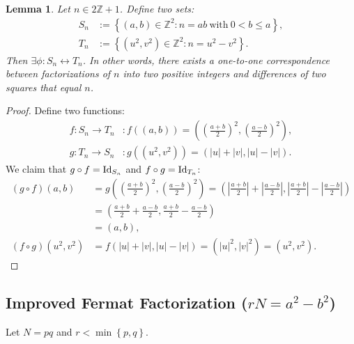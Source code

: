 \documentclass[12pt,openany]{book}
\newtheorem{lemma}[theorem]{Lemma}
\theoremstyle{definition}
\newcommand{\set}[1]{\left\{#1\right\}}
\newcommand{\Z}{\mathbb{Z}}
\newcommand{\of}[1]{\left( #1 \right)}
\newcommand{\abs}[1]{\left\lvert #1 \right\rvert}
\newcommand{\id}{\operatorname{\textnormal{Id}}}
\begin{document}
	\begin{tcolorbox}[colback=white,colframe=lemcolor,arc=5pt,title={\color{white}\bf }]
		\begin{lemma}
			Let $n\in 2\Z+1$. Define two sets: \begin{align*}
				S_n&:=\set{(a,b)\in\Z^2:n=ab\ \text{with}\ 0<b\leq a},\\
				T_n&:=\set{\of{u^2,v^2}\in\Z^2:n=u^2-v^2}.
			\end{align*} Then $\exists\phi:S_n\leftrightarrow T_n$. In other words, there exists a one-to-one correspondence between factorizations of $n$ into two positive integers and differences of two squares that equal $n$.
		\end{lemma}
	\end{tcolorbox}
	\begin{proof}
		Define two functions: \begin{align*}
			f:S_n\to T_n&:f\of{\of{a,b}}=\of{\of{\frac{a+b}{2}}^2,\of{\frac{a-b}{2}}^2},\\
			g:T_n\to S_n&:g\of{\of{u^2,v^2}}=\of{\abs{u}+\abs{v},\abs{u}-\abs{v}}.
		\end{align*} We claim that $g\circ f=\id_{S_n}$ and $f\circ g=\id_{T_n}$:\begin{align*}
			\of{g\circ f}(a,b)&=g\of{\of{\frac{a+b}{2}}^2,\of{\frac{a-b}{2}}^2}=\of{\abs{\frac{a+b}{2}}+\abs{\frac{a-b}{2}},\abs{\frac{a+b}{2}}-\abs{\frac{a-b}{2}}}\\
			&=\of{{\frac{a+b}{2}}+{\frac{a-b}{2}},{\frac{a+b}{2}}-{\frac{a-b}{2}}}\\
			&=\of{a,b},\\
			\of{f\circ g}\of{u^2,v^2}&=f\of{\abs{u}+\abs{v},\abs{u}-\abs{v}}=\of{\abs{u}^2,\abs{v}^2}=\of{u^2,v^2}.
		\end{align*}
	\end{proof}
	
	\subsection{Improved Fermat Factorization ($rN=a^2-b^2$)}
	
	Let $N=pq$ and $r<\min\set{p,q}$.
	
\end{document}

